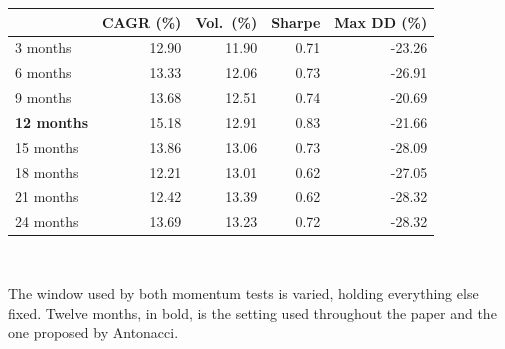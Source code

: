 \small
\begin{tabular}{lrrrr}
\toprule
 & \textbf{CAGR (\%)} & \textbf{Vol.\ (\%)} & \textbf{Sharpe} & \textbf{Max DD (\%)} \\
\midrule
3 months & 12.90 & 11.90 & 0.71 & -23.26 \\
6 months & 13.33 & 12.06 & 0.73 & -26.91 \\
9 months & 13.68 & 12.51 & 0.74 & -20.69 \\
\textbf{12 months} & 15.18 & 12.91 & 0.83 & -21.66 \\
15 months & 13.86 & 13.06 & 0.73 & -28.09 \\
18 months & 12.21 & 13.01 & 0.62 & -27.05 \\
21 months & 12.42 & 13.39 & 0.62 & -28.32 \\
24 months & 13.69 & 13.23 & 0.72 & -28.32 \\
\bottomrule
\end{tabular}
\\[0.4em]
\begin{minipage}{\linewidth}\footnotesize The window used by both momentum tests is varied, holding everything else fixed. Twelve months, in bold, is the setting used throughout the paper and the one proposed by Antonacci.\end{minipage}
